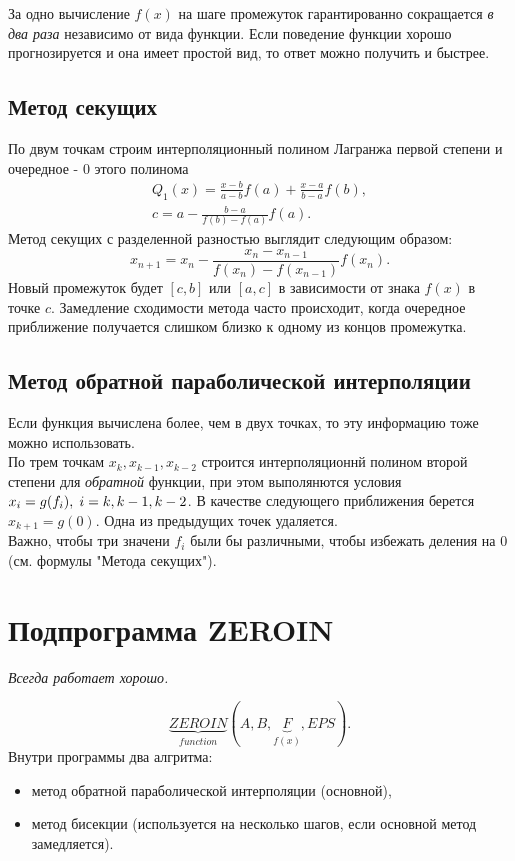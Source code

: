 \documentclass[a4paper,11pt]{article}
\begin{document}
\noindent За одно вычисление $f(x)$ на шаге промежуток гарантированно сокращается \textit{в два раза} независимо от вида функции.
Если поведение функции хорошо прогнозируется и она имеет простой вид, то ответ можно получить и быстрее.

\subsection{Метод секущих}
По двум точкам строим интерполяционный полином Лагранжа первой степени и очередное - $0$ этого полинома
\begin{gather*}
  Q_1(x) = \frac{x-b}{a-b}f(a) + \frac{x-a}{b-a}f(b), \\
  c = a - \frac{b-a}{f(b)-f(a)}f(a).
\end{gather*}
Метод секущих с разделенной разностью выглядит следующим образом:
\begin{equation*}
  x_{n+1} = x_n - \frac{x_n-x_{n-1}}{f(x_n)-f(x_{n-1})}f(x_n).
\end{equation*}
Новый промежуток будет $[c, b]$ или $[a, c]$ в зависимости от знака $f(x)$ в точке $c$. Замедление сходимости метода часто происходит,
когда очередное приближение получается слишком близко к одному из концов промежутка.

\subsection{Метод обратной параболической интерполяции}
Если функция вычислена более, чем в двух точках, то эту информацию тоже можно использовать. \\

\noindent По трем точкам $x_k,x_{k-1},x_{k-2}$ строится интерполяционнй полином второй степени для \textit{обратной} функции,
при этом выполянются условия \\$x_i=g(f_i), \hspace{1mm} i =k, k-1, k-2$. В качестве следующего приближения берется $x_{k+1}=g(0)$.
Одна из предыдущих точек удаляется. \\

\noindent Важно, чтобы три значени $f_i$ были бы различными, чтобы избежать деления на $0$ (см. формулы "Метода секущих").

\section{Подпрограмма ZEROIN}
\begin{flushright}
  \textit{Всегда работает хорошо.}
\end{flushright}
\begin{equation*}
  \underbrace{ZEROIN}_{function}(A, B, \underbrace{F}_{f(x)}, EPS).
\end{equation*}
Внутри программы два алгритма:
\begin{itemize}
  \item метод обратной параболической интерполяции (основной),
  \item метод бисекции (используется на несколько шагов, если основной метод замедляется).
\end{itemize}
\end{document}
